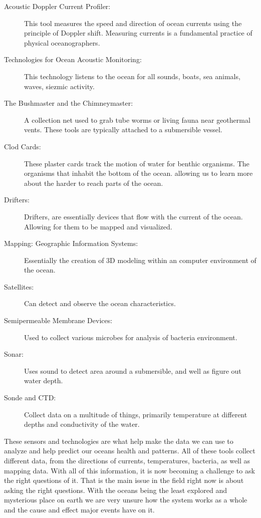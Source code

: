 \documentclass[sigconf]{acmart}
\begin{document}
\begin{description}

\item [Acoustic Doppler Current Profiler:] This tool measures the speed
  and direction of ocean currents using the principle of Doppler
  shift. Measuring currents is a fundamental practice of physical
  oceanographers.

\item [Technologies for Ocean Acoustic Monitoring:] This technology
  listens to the ocean for all sounds, boats, sea animals, waves,
  siezmic activity.

\item [The Bushmaster and the Chimneymaster:] A collection net used to
  grab tube worms or living fauna near geothermal vents.  These tools
  are typically attached to a submersible vessel.

\item [Clod Cards:] These plaster cards track the motion of water for
  benthic organisms.  The organisms that inhabit the bottom of the
  ocean.  allowing us to learn more about the harder to reach parts of
  the ocean.

\item [Drifters:] Drifters, are essentially devices that flow with the
  current of the ocean.  Allowing for them to be mapped and
  visualized.

\item [Mapping: Geographic Information Systems:] Essentially the
  creation of 3D modeling within an computer environment of the ocean.

\item [Satellites:] Can detect and observe the ocean characteristics.

\item [Semipermeable Membrane Devices:] Used to collect various
  microbes for analysis of bacteria environment.

\item [Sonar:] Uses sound to detect area around a submersible, and
  well as figure out water depth.

\item [Sonde and CTD:] Collect data on a multitude of things,
  primarily temperature at different depths and conductivity of the
  water.

\end{description}

These sensors and technologies are what help make the data we can use
to analyze and help predict our oceans health and patterns.  All of
these tools collect different data, from the directions of currents,
temperatures, bacteria, as well as mapping data.  With all of this
information, it is now becoming a challenge to ask the right questions
of it.  That is the main issue in the field right now is about asking
the right questions.  With the oceans being the least explored and
mysterious place on earth we are very unsure how the system works as a
whole and the cause and effect major events have on it.
\end{document}
